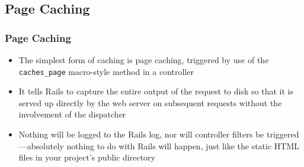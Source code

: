 \documentclass{beamer}
\begin{document}
\subsection{Page Caching}
\begin{frame}[fragile]
\frametitle{Page Caching}
\begin{itemize}
\item The simplest form of caching is page caching, triggered by use of the \texttt{caches\_page}
macro-style method in a controller
\item It tells Rails to capture the entire output of the
request to disk so that it is served up directly by the web server on subsequent requests
without the involvement of the dispatcher
\item Nothing will be logged to the Rails log, nor
will controller filters be triggered—absolutely nothing to do with Rails will happen, just
like the static HTML files in your project’s public directory
\end{itemize}
\end{frame}
\end{document}
